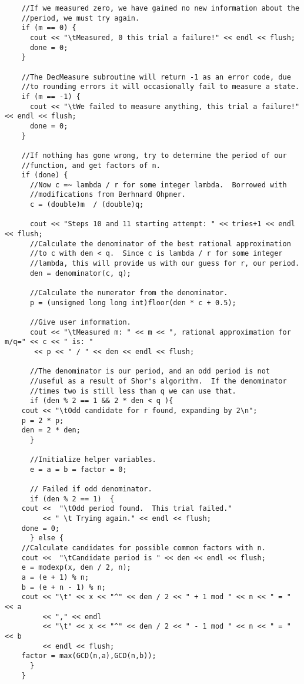\documentclass[]{article}
\begin{document}
\begin{verbatim}
    //If we measured zero, we have gained no new information about the
    //period, we must try again.
    if (m == 0) {
      cout << "\tMeasured, 0 this trial a failure!" << endl << flush;
      done = 0;
    }

    //The DecMeasure subroutine will return -1 as an error code, due
    //to rounding errors it will occasionally fail to measure a state.
    if (m == -1) {
      cout << "\tWe failed to measure anything, this trial a failure!" << endl << flush;
      done = 0;
    }
    
    //If nothing has gone wrong, try to determine the period of our
    //function, and get factors of n.
    if (done) {
      //Now c =~ lambda / r for some integer lambda.  Borrowed with
      //modifications from Berhnard Ohpner.
      c = (double)m  / (double)q;

      cout << "Steps 10 and 11 starting attempt: " << tries+1 << endl << flush;
      //Calculate the denominator of the best rational approximation
      //to c with den < q.  Since c is lambda / r for some integer
      //lambda, this will provide us with our guess for r, our period.
      den = denominator(c, q);
      
      //Calculate the numerator from the denominator.
      p = (unsigned long long int)floor(den * c + 0.5);

      //Give user information.
      cout << "\tMeasured m: " << m << ", rational approximation for m/q=" << c << " is: "
	   << p << " / " << den << endl << flush;

      //The denominator is our period, and an odd period is not
      //useful as a result of Shor's algorithm.  If the denominator
      //times two is still less than q we can use that.
      if (den % 2 == 1 && 2 * den < q ){
	cout << "\tOdd candidate for r found, expanding by 2\n";
	p = 2 * p; 
	den = 2 * den;
      }

      //Initialize helper variables.
      e = a = b = factor = 0;

      // Failed if odd denominator.
      if (den % 2 == 1)  {          
	cout <<  "\tOdd period found.  This trial failed." 
	     << " \t Trying again." << endl << flush;
	done = 0;
      } else {
	//Calculate candidates for possible common factors with n.
	cout <<  "\tCandidate period is " << den << endl << flush;
	e = modexp(x, den / 2, n);    
	a = (e + 1) % n;     
	b = (e + n - 1) % n;          
	cout << "\t" << x << "^" << den / 2 << " + 1 mod " << n << " = " << a 
	     << "," << endl 
	     << "\t" << x << "^" << den / 2 << " - 1 mod " << n << " = " << b 
	     << endl << flush;
	factor = max(GCD(n,a),GCD(n,b));
      }
    }
    

\end{verbatim}
\end{document}
